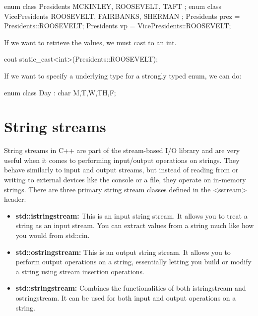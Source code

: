 \documentclass{report}
\begin{document}
    \begin{cppcode}
enum class Presidents { MCKINLEY, ROOSEVELT, TAFT }; 
enum class VicePresidents { ROOSEVELT, FAIRBANKS, SHERMAN };
Presidents prez = Presidents::ROOSEVELT;
Presidents vp = VicePresidents::ROOSEVELT;
    \end{cppcode}
    
    \bigbreak \noindent 
    If we want to retrieve the values, we must cast to an int.
    \bigbreak \noindent 
    
    \begin{cppcode}
cout static_cast<int>(Presidents::ROOSEVELT);
    \end{cppcode}
    
    \bigbreak \noindent 
    If we want to specify a underlying type for a strongly typed enum, we can do:
    \bigbreak \noindent 
    
    \begin{cppcode}
enum class Day : char {M,T,W,TH,F};
    \end{cppcode}
    


        \pagebreak \bigbreak \noindent 
    \section{\LARGE String streams}
    \bigbreak \noindent 
     String streams in C++ are part of the stream-based I/O library and are very useful when it comes to performing input/output operations on strings. They behave similarly to input and output streams, but instead of reading from or writing to external devices like the console or a file, they operate on in-memory strings.
     \bigbreak \noindent 
     There are three primary string stream classes defined in the <sstream> header:
     \begin{itemize}
         \item \textbf{std::istringstream:} This is an input string stream. It allows you to treat a string as an input stream. You can extract values from a string much like how you would from std::cin.
         \item \textbf{std::ostringstream:} This is an output string stream. It allows you to perform output operations on a string, essentially letting you build or modify a string using stream insertion operations.
         \item \textbf{std::stringstream:} Combines the functionalities of both istringstream and ostringstream. It can be used for both input and output operations on a string.
     \end{itemize}
\end{document}
